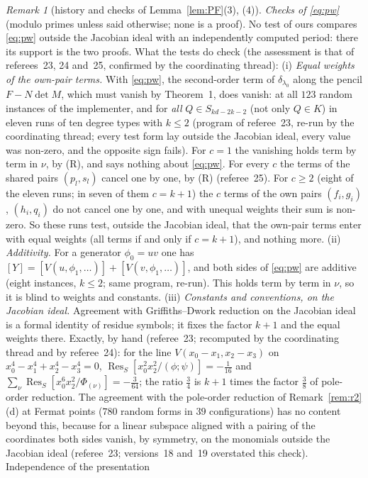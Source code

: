 \documentclass[11pt]{article}
\numberwithin{equation}{section}
\theoremstyle{remark}
\newtheorem{remark}[theorem]{Remark}
\newcommand{\Res}{\operatorname{Res}}
\newcommand{\lz}{\lambda_0}
\begin{document}
\begin{remark}[history and checks of Lemma~\ref{lem:PF}(3), (4)]
\emph{Checks of \eqref{eq:pw}} (modulo primes unless said otherwise; none is a proof). No test of ours compares
\eqref{eq:pw} outside the Jacobian ideal with an independently computed period: there its support is the two
proofs. What the tests do check (the assessment is that of referees~23, 24 and~25, confirmed by the coordinating
thread):
(i) \emph{Equal weights of the own-pair terms.} With \eqref{eq:pw}, the second-order term of $\delta_{\lz}$ along the
pencil $F-N\det M$, which must vanish by Theorem~1, does vanish: at all $123$ random instances of the implementer,
and for \emph{all} $Q\in S_{kd-2k-2}$ (not only $Q\in K$) in eleven runs of ten degree types with $k\le2$ (program of
referee~23, re-run by the coordinating thread; every test form lay outside the Jacobian ideal, every value was
non-zero, and the opposite sign fails). For $c=1$ the vanishing holds term by term in $\nu$, by (R), and says
nothing about \eqref{eq:pw}. For every $c$ the terms of the shared pairs $(p_l,s_l)$ cancel one by one, by (R)
(referee~25). For $c\ge2$ (eight of the eleven runs; in seven of them $c=k+1$) the $c$ terms of the own pairs
$(f_i,g_i)$, $(h_i,q_i)$ do not cancel one by one, and with unequal weights their sum is non-zero. So these runs
test, outside the Jacobian ideal, that the own-pair terms enter with equal weights (all terms if and only if
$c=k+1$), and nothing more.
(ii) \emph{Additivity.} For a generator $\phi_0=uv$ one has $[Y]=[V(u,\phi_1,\dots)]+[V(v,\phi_1,\dots)]$, and both
sides of \eqref{eq:pw} are additive (eight instances, $k\le2$; same program, re-run). This holds term by term in
$\nu$, so it is blind to weights and constants.
(iii) \emph{Constants and conventions, on the Jacobian ideal.} Agreement with Griffiths--Dwork reduction on the
Jacobian ideal is a formal identity of residue symbols; it fixes the factor $k+1$ and the equal weights there.
Exactly, by hand (referee~23; recomputed by the coordinating thread and by referee~24): for the line
$V(x_0-x_1,x_2-x_3)$ on $x_0^4-x_1^4+x_2^4-x_3^4=0$, $\Res_S[x_0^2x_2^2/(\phi;\psi)]=-\frac1{16}$ and
$\sum_\nu\Res_S[x_0^6x_2^2/\Phi_{(\nu)}]=-\frac3{64}$; the ratio $\frac34$ is $k+1$ times the factor $\frac38$ of
pole-order reduction. The agreement with the pole-order reduction of Remark~\ref{rem:r2}(d) at Fermat
points ($780$ random forms in $39$ configurations) has no content beyond this, because for a linear subspace
aligned with a pairing of the coordinates both sides vanish, by symmetry, on the monomials outside the Jacobian
ideal (referee~23; versions~18 and~19 overstated this check). Independence of the presentation

\end{remark}
\end{document}
